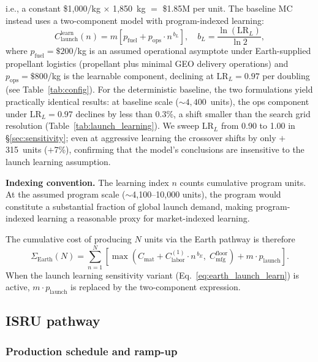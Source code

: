 \documentclass[preprint,12pt]{elsarticle}
\begin{document}
i.e., a constant \$1{,}000/kg $\times$ 1{,}850~kg $=$ \$1.85M per unit. The baseline MC instead uses a two-component model with program-indexed learning:
\begin{equation}
  C_{\mathrm{launch}}^{\mathrm{learn}}(n) = m \left[ p_{\mathrm{fuel}} + p_{\mathrm{ops}} \cdot n^{\,b_L} \right], \quad b_L = \frac{\ln(\mathrm{LR}_L)}{\ln 2},
  \label{eq:earth_launch_learn}
\end{equation}
where $p_{\mathrm{fuel}} = \$200$/kg is an assumed operational asymptote under Earth-supplied propellant logistics (propellant plus minimal GEO delivery operations) and $p_{\mathrm{ops}} = \$800$/kg is the learnable component, declining at $\mathrm{LR}_L = 0.97$ per doubling (see Table~\ref{tab:config}). For the deterministic baseline, the two formulations yield practically identical results: at baseline scale (${\sim}4{,}400$~units), the ops component under $\mathrm{LR}_L = 0.97$ declines by less than 0.3\%, a shift smaller than the search grid resolution (Table~\ref{tab:launch_learning}). We sweep $\mathrm{LR}_L$ from 0.90 to 1.00 in \S\ref{sec:sensitivity}; even at aggressive learning the crossover shifts by only $+$315~units ($+$7\%), confirming that the model's conclusions are insensitive to the launch learning assumption.

\textbf{Indexing convention.} The learning index $n$ counts cumulative program units. At the assumed program scale ($\sim$4{,}100--10{,}000 units), the program would constitute a substantial fraction of global launch demand, making program-indexed learning a reasonable proxy for market-indexed learning.

The cumulative cost of producing $N$ units via the Earth pathway is therefore
\begin{equation}
  \Sigma_{\mathrm{Earth}}(N) = \sum_{n=1}^{N} \left[ \max\!\left(C_{\mathrm{mat}} + C_{\mathrm{labor}}^{(1)} \cdot n^{\,b_E},\; C_{\mathrm{mfg}}^{\mathrm{floor}}\right) + m \cdot p_{\mathrm{launch}} \right].
  \label{eq:earth_cum}
\end{equation}
When the launch learning sensitivity variant (Eq.~\ref{eq:earth_launch_learn}) is active, $m \cdot p_{\mathrm{launch}}$ is replaced by the two-component expression.

\subsection{ISRU pathway}

\subsubsection{Production schedule and ramp-up}
\end{document}
